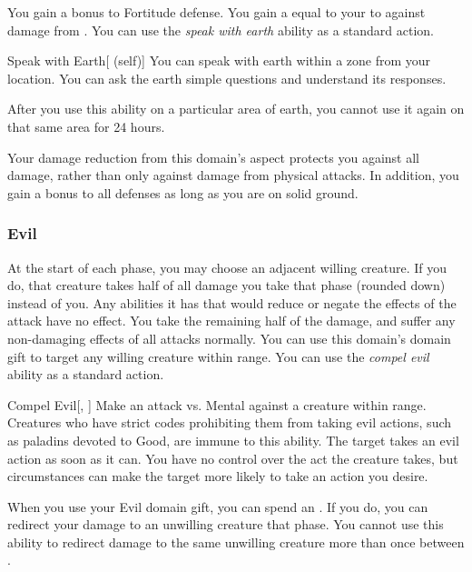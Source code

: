              You gain a  bonus to Fortitude defense.
             You gain a  equal to your  to  against damage from .
             You can use the \textit{speak with earth} ability as a standard action.
            \begin{attuneability}{Speak with Earth}[ (self)]
                You can speak with earth within a \areahuge zone from your location.
                You can ask the earth simple questions and understand its responses.

                After you use this ability on a particular area of earth, you cannot use it again on that same area for 24 hours.
            \end{attuneability}
             Your damage reduction from this domain's aspect protects you against all damage, rather than only against damage from physical attacks.
            In addition, you gain a  bonus to all defenses as long as you are on solid ground.

        \subsubsection{Evil}
             At the start of each phase, you may choose an adjacent willing creature.
            If you do, that creature takes half of all damage you take that phase (rounded down) instead of you.
            Any abilities it has that would reduce or negate the effects of the attack have no effect.
            You take the remaining half of the damage, and suffer any non-damaging effects of all attacks normally.
             You can use this domain's domain gift to target any willing creature within \rngclose range.
             You can use the \textit{compel evil} ability as a standard action.
            \begin{apability}{Compel Evil}[, ]
                Make an attack vs. Mental against a creature within \rngmed range.
                Creatures who have strict codes prohibiting them from taking evil actions, such as paladins devoted to Good, are immune to this ability.
                \hit The target takes an evil action as soon as it can.
                You have no control over the act the creature takes, but circumstances can make the target more likely to take an action you desire.
            \end{apability}
             When you use your Evil domain gift, you can spend an .
            If you do, you can redirect your damage to an unwilling creature that phase.
            You cannot use this ability to redirect damage to the same unwilling creature more than once between .

